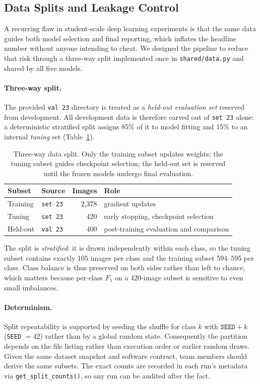 \documentclass[11pt,twoside,a4paper]{article}
\begin{document}
\subsection{Data Splits and Leakage Control}
\label{sec:splits}

A recurring flaw in student-scale deep learning experiments is that the same
data guides both model selection and final reporting, which inflates the
headline number without anyone intending to cheat. We designed the pipeline to
reduce that risk through a three-way split implemented once in
\texttt{shared/data.py} and shared by all five models.

\paragraph{Three-way split.}
The provided \texttt{val 23} directory is treated as a \emph{held-out
evaluation set} reserved from development. All development data is therefore
carved out of \texttt{set 23} alone: a
deterministic stratified split assigns 85\% of it to model fitting and 15\% to
an internal \emph{tuning} set (Table~\ref{tab:splits}).

\begin{table}[H]
\centering
\caption{Three-way data split. Only the training subset updates weights; the
tuning subset guides checkpoint selection; the held-out set is reserved until
the frozen models undergo final evaluation.}
\label{tab:splits}
\small
\begin{tabular}{llrl}
\toprule
Subset & Source & Images & Role \\
\midrule
Training & \texttt{set 23} & 2{,}378 & gradient updates \\
Tuning   & \texttt{set 23} & 420 & early stopping, checkpoint selection \\
Held-out & \texttt{val 23} & 400 & post-training evaluation and comparison \\
\bottomrule
\end{tabular}
\end{table}

The split is \emph{stratified}: it is drawn independently within each class, so
the tuning subset contains exactly 105 images per class and the training
subset 594--595 per class. Class balance is thus preserved on both sides rather
than left to chance, which matters because per-class $F_1$ on a 420-image
subset is sensitive to even small imbalances.

\paragraph{Determinism.}
Split repeatability is supported by seeding the shuffle for class $k$ with
$\texttt{SEED} + k$ (\texttt{SEED} $=42$) rather than by a global random state.
Consequently the partition depends on the file listing rather than execution
order or earlier random draws. Given the same dataset snapshot and software
contract, team members should derive the same subsets. The exact counts are
recorded in each run's metadata via \texttt{get\_split\_counts()}, so any run
can be audited after the fact.
\end{document}
